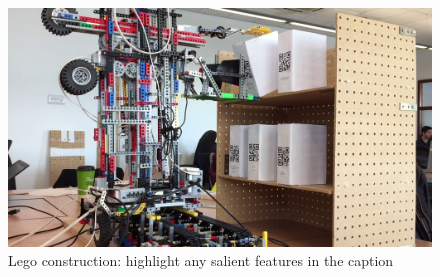 \documentclass{article}
\begin{document}





\begin{figure}[tb]
\vskip 5mm
\begin{center}
\centerline{\includegraphics[width=\columnwidth]{figs/crane}}
\caption{Lego construction: highlight any salient features in the caption}
\label{fig:sample-fig}
\end{center}
\vskip -5mm
\end{figure} 
\end{document}
